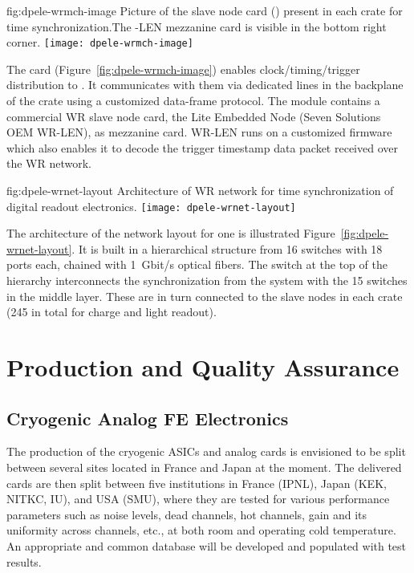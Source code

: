\begin{dunefigure}{fig:dpele-wrmch-image}
{Picture of the  slave node card () present in each  crate for time synchronization.The -LEN mezzanine card is visible in the bottom right corner.}
\texttt{[image: dpele-wrmch-image]}
\end{dunefigure}

The  card (Figure~\ref{fig:dpele-wrmch-image}) enables clock/timing/trigger distribution to . It communicates with them via dedicated lines in the backplane of the  crate using a customized data-frame protocol. The module contains a commercial WR slave node card, the  Lite Embedded Node (Seven Solutions OEM WR-LEN), as mezzanine card. WR-LEN runs on a customized firmware which also enables it to decode the trigger timestamp data packet received over the WR network.

\begin{dunefigure}{fig:dpele-wrnet-layout}
{Architecture of WR network for time synchronization of digital readout electronics.}
\texttt{[image: dpele-wrnet-layout]}
\end{dunefigure}

The architecture of the  network layout for one  is illustrated Figure~\ref{fig:dpele-wrnet-layout}. It is built in a hierarchical structure from \num{16}  switches with \num{18} ports each,  chained with \SI{1}{Gbit/s} optical fibers. The switch at the top of the hierarchy interconnects the synchronization %
 from the  system with the \num{15} switches in the middle layer. These are in turn connected to the  slave nodes in each  crate (\num{245} in total for charge and light readout). 



\section{Production and Quality Assurance}
\label{sec:fddp-tpc-elec-prod-assy}

\subsection{Cryogenic Analog FE Electronics}
\label{sec:fddp-tpc-elec-prod-fe}
The production of the cryogenic ASICs and analog  cards is envisioned to be split between several sites located in France and Japan at the moment. The delivered cards are then split between five institutions in France (IPNL), Japan (KEK, NITKC, IU), and USA (SMU), where they are tested for various performance parameters such as noise levels, dead channels, hot channels, gain and its uniformity across channels, etc., at both room and operating cold temperature. An appropriate and common database will be developed and populated with test results. 

